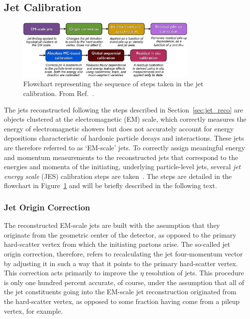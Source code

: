 \subsection{Jet Calibration}
\label{sec:jet_calib}

\begin{figure}[!htb]
    \begin{center}
        \includegraphics[width=0.8\textwidth]{figures/chapter3/jets/jes_calibration_sequence}
        \caption{
            Flowchart representing the sequence of steps taken in the jet calibration.
            From Ref.~\cite{Aaboud:2017jcu}.
        }
        \label{fig:jes_sequence}
    \end{center}
\end{figure}

The jets reconstructed following the steps described in Section~\ref{sec:jet_reco} are objects clustered
at the electromagnetic (EM) scale, which correctly measures the energy of electromagnetic showers but does not
accurately account for energy depositions characteristic of hardonic particle decays and interactions.
These jets are therefore referred to as `EM-scale' jets.
To correctly assign meaningful energy and momentum measurements to the reconstructed jets that correspond
to the energies and momenta of the initiating, underlying particle-level jets, several \textit{jet energy scale} (JES) calibration steps are taken~\cite{Aaboud:2017jcu}.
The steps are detailed in the flowchart in Figure~\ref{fig:jes_sequence} and will be briefly described in the following text.

\subsubsection{Jet Origin Correction}
\label{sec:jet_origin_correction}

The reconstructed EM-scale jets are built with the assumption that they originate from the geometric center
of the detector, as opposed to the primary hard-scatter vertex from which the initiating partons arise.
The so-called jet origin correction, therefore, refers to recalculating the jet four-momentum vector by adjusting it
in such a way that it points to the primary hard-scatter vertex.
This correction acts primarily to improve the $\eta$ resolution of jets.
This procedure is only one hundred percent accurate, of course, under the assumption that all of the jet constituents
going into the EM-scale jet reconstruction originated from the hard-scatter vertex, as opposed to some fraction having come from
a pileup vertex, for example.

